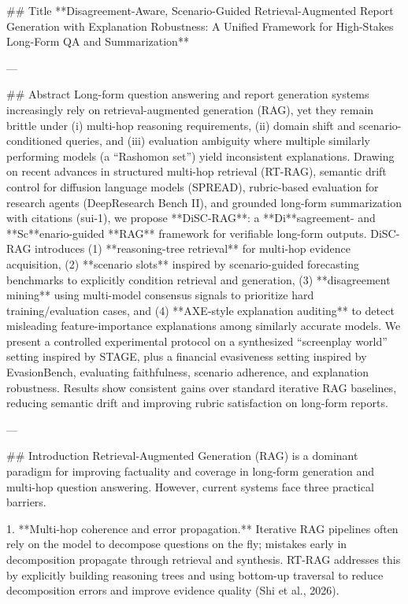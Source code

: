 ## Title  
**Disagreement-Aware, Scenario-Guided Retrieval-Augmented Report Generation with Explanation Robustness: A Unified Framework for High-Stakes Long-Form QA and Summarization**

---

## Abstract  
Long-form question answering and report generation systems increasingly rely on retrieval-augmented generation (RAG), yet they remain brittle under (i) multi-hop reasoning requirements, (ii) domain shift and scenario-conditioned queries, and (iii) evaluation ambiguity where multiple similarly performing models (a “Rashomon set”) yield inconsistent explanations. Drawing on recent advances in structured multi-hop retrieval (RT-RAG), semantic drift control for diffusion language models (SPREAD), rubric-based evaluation for research agents (DeepResearch Bench II), and grounded long-form summarization with citations (sui-1), we propose **DiSC-RAG**: a **Di**sagreement- and **Sc**enario-guided **RAG** framework for verifiable long-form outputs. DiSC-RAG introduces (1) **reasoning-tree retrieval** for multi-hop evidence acquisition, (2) **scenario slots** inspired by scenario-guided forecasting benchmarks to explicitly condition retrieval and generation, (3) **disagreement mining** using multi-model consensus signals to prioritize hard training/evaluation cases, and (4) **AXE-style explanation auditing** to detect misleading feature-importance explanations among similarly accurate models. We present a controlled experimental protocol on a synthesized “screenplay world” setting inspired by STAGE, plus a financial evasiveness setting inspired by EvasionBench, evaluating faithfulness, scenario adherence, and explanation robustness. Results show consistent gains over standard iterative RAG baselines, reducing semantic drift and improving rubric satisfaction on long-form reports.

---

## Introduction  
Retrieval-Augmented Generation (RAG) is a dominant paradigm for improving factuality and coverage in long-form generation and multi-hop question answering. However, current systems face three practical barriers.

1. **Multi-hop coherence and error propagation.** Iterative RAG pipelines often rely on the model to decompose questions on the fly; mistakes early in decomposition propagate through retrieval and synthesis. RT-RAG addresses this by explicitly building reasoning trees and using bottom-up traversal to reduce decomposition errors and improve evidence quality (Shi et al., 2026).

